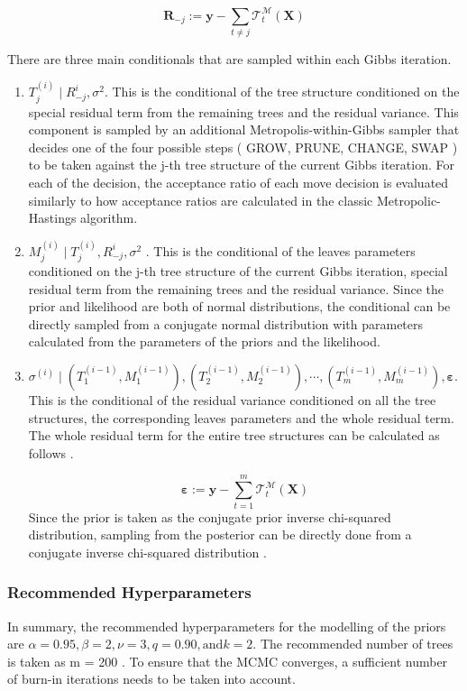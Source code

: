 \documentclass{usiinftr}
\begin{document}
\begin{equation}
\boldsymbol{R}_{-j}:=\boldsymbol{y}-\sum_{t \neq j} \mathcal{T}_{t}^{\mathcal{M}}(\boldsymbol{X})
\end{equation}

There are three main conditionals that are sampled within each Gibbs iteration.

\begin{enumerate}
\item $ T_j^{(i)} \mid R_{-j}^i, \sigma^2 $. This is the conditional of the tree structure conditioned on the special residual term from the remaining trees and the residual variance. This component is sampled by an additional Metropolis-within-Gibbs sampler that decides one of the four possible steps ( GROW, PRUNE, CHANGE, SWAP ) to be taken against the j-th tree structure of the current Gibbs iteration. For each of the decision, the acceptance ratio of each move decision is evaluated similarly to how acceptance ratios are calculated in the classic Metropolic-Hastings algorithm.
\item $ M_j^{(i)} \mid T_j^{(i)}, R_{-j}^i, \sigma^2 $ \cite{7}. This is the conditional of the leaves parameters conditioned on the j-th tree structure of the current Gibbs iteration, special residual term from the remaining trees and the residual variance. Since the prior and likelihood are both of normal distributions, the conditional can be directly sampled from a conjugate normal distribution with parameters calculated from the parameters of the priors and the likelihood.
\item $\sigma^(i) \mid (T_1^{(i-1)},M_1^{(i-1)}),(T_2^{(i-1)},M_2^{(i-1)}), \cdots, (T_m^{(i-1)},M_m^{(i-1)}), \boldsymbol{\varepsilon}  $. This is the conditional of the residual variance conditioned on all the tree structures, the corresponding leaves parameters and the whole residual term. The whole residual term for the entire tree structures can be calculated as follows \cite{7}.

\begin{equation}
\boldsymbol{\varepsilon}:=\boldsymbol{y}-\sum_{t=1}^m \mathcal{T}_{t}^{\mathcal{M}}(\boldsymbol{X})
\end{equation}
Since the prior is taken as the conjugate prior inverse chi-squared distribution, sampling from the posterior can be directly done from a conjugate inverse chi-squared distribution \cite{7}.
\end{enumerate}

\subsubsection{Recommended Hyperparameters}\label{rec}
In summary, the recommended hyperparameters for the modelling of the priors are  $\alpha = 0.95, \beta =2, \nu = 3, q = 0.90, \text{and} k = 2$. The recommended number of trees is taken as m = 200 \cite{7}. To ensure that the MCMC converges, a sufficient number of burn-in iterations needs to be taken into account.
\end{document}
